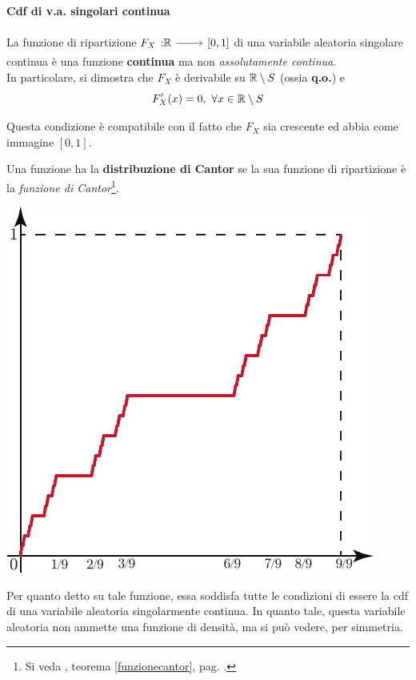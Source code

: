 \paragraph{Cdf di v.a. singolari continua}
La funzione di ripartizione $\funz{F_X}{\realset}{\left[0,1\right]}$ di una variabile aleatoria singolare continua è una funzione \textbf{continua} ma non \textit{assolutamente continua}.\\
In particolare, si dimostra che $F_X$ è derivabile su $\mathbb{R}\setminus S$ (ossia \textbf{q.o.}) e
\begin{equation}
	F'_X(x)=0,\ \forall x\in\realset\setminus S
\end{equation}
\begin{observe}
	Questa condizione è compatibile con il fatto che $F_X$ sia crescente ed abbia come immagine $\left[0,1\right]$.
\end{observe}
\begin{examplewt}
Una funzione ha la \textbf{distribuzione di Cantor} se la sua funzione di ripartizione è la \textit{funzione di Cantor}\footnote{Si veda , teorema \ref{funzionecantor}, pag. \pageref{funzionecantor}.}.
\begin{center}
	\includegraphics[width=0.4\paperwidth]{images/vasingolarecontinua}
\end{center}
Per quanto detto su tale funzione, essa soddisfa tutte le condizioni di essere la cdf di una variabile aleatoria singolarmente continua. In quanto tale, questa variabile aleatoria non ammette una funzione di densità, ma si può vedere, per simmetria.
\end{examplewt}
